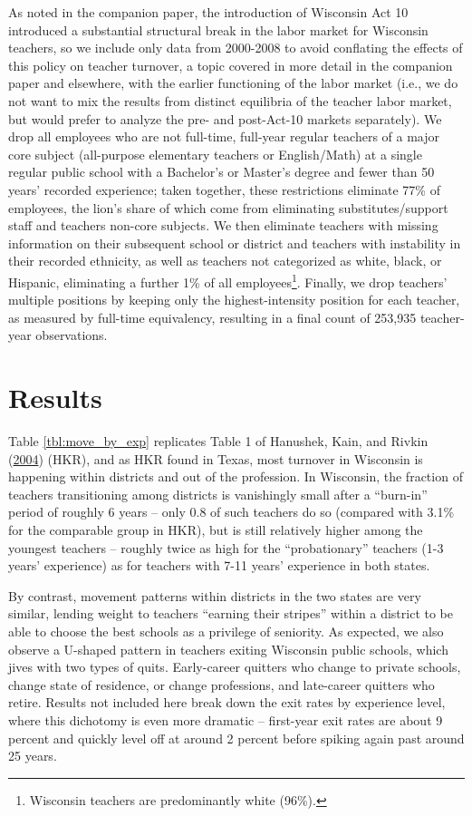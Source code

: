 \documentclass[]{article}
\let\rmarkdownfootnote\footnote%
\def\footnote{\protect\rmarkdownfootnote}
\begin{document}
As noted in the companion paper, the introduction of Wisconsin Act 10
introduced a substantial structural break in the labor market for
Wisconsin teachers, so we include only data from 2000-2008 to avoid
conflating the effects of this policy on teacher turnover, a topic
covered in more detail in the companion paper and elsewhere, with the
earlier functioning of the labor market (i.e., we do not want to mix the
results from distinct equilibria of the teacher labor market, but would
prefer to analyze the pre- and post-Act-10 markets separately). We drop
all employees who are not full-time, full-year regular teachers of a
major core subject (all-purpose elementary teachers or English/Math) at
a single regular public school with a Bachelor's or Master's degree and
fewer than 50 years' recorded experience; taken together, these
restrictions eliminate 77\% of employees, the lion's share of which come
from eliminating substitutes/support staff and teachers non-core
subjects. We then eliminate teachers with missing information on their
subsequent school or district and teachers with instability in their
recorded ethnicity, as well as teachers not categorized as white, black,
or Hispanic, eliminating a further 1\% of all employees\footnote{Wisconsin
  teachers are predominantly white (96\%).}. Finally, we drop teachers'
multiple positions by keeping only the highest-intensity position for
each teacher, as measured by full-time equivalency, resulting in a final
count of 253,935 teacher-year observations.

\section{Results}\label{results}

Table \ref{tbl:move_by_exp} replicates Table 1 of Hanushek, Kain, and
Rivkin (\protect\hyperlink{ref-hanushek}{2004}) (HKR), and as HKR found
in Texas, most turnover in Wisconsin is happening within districts and
out of the profession. In Wisconsin, the fraction of teachers
transitioning among districts is vanishingly small after a ``burn-in''
period of roughly 6 years -- only 0.8 of such teachers do so (compared
with 3.1\% for the comparable group in HKR), but is still relatively
higher among the youngest teachers -- roughly twice as high for the
``probationary'' teachers (1-3 years' experience) as for teachers with
7-11 years' experience in both states.

By contrast, movement patterns within districts in the two states are
very similar, lending weight to teachers ``earning their stripes''
within a district to be able to choose the best schools as a privilege
of seniority. As expected, we also observe a U-shaped pattern in
teachers exiting Wisconsin public schools, which jives with two types of
quits. Early-career quitters who change to private schools, change state
of residence, or change professions, and late-career quitters who
retire. Results not included here break down the exit rates by
experience level, where this dichotomy is even more dramatic --
first-year exit rates are about 9 percent and quickly level off at
around 2 percent before spiking again past around 25 years.
\end{document}
